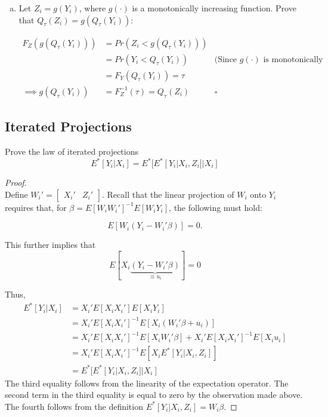 \documentclass[11pt]{article}
\begin{document}
\begin{enumerate}[a)]

	\item Let $Z_i = g(Y_i)$, where $g(\cdot)$ is a monotonically increasing function. Prove that $Q_{\tau}(Z_i) = g(Q_{\tau}(Y_i))$:

	\begin{align*}
		F_Z(g(Q_{\tau}(Y_i))) &= Pr(Z_i < g(Q_{\tau}(Y_i))) \\
		&= Pr(Y_i < Q_{\tau}(Y_i)) &\mbox{(Since $g(\cdot)$ is monotonically increasing)} \\
		&= F_Y(Q_{\tau}(Y_i)) = \tau \\
		\implies g(Q_{\tau}(Y_i)) &= F_Z^{-1}(\tau) = Q_{\tau}(Z_i) &\square
	\end{align*}
	

\end{enumerate}


\subsection*{Iterated Projections}
Prove the law of iterated projections 
$$E^*[Y_i|X_i] = E^*[E^*[Y_i|X_i,Z_i]|X_i]$$

\begin{proof}\mbox{}\\
	Define $W_i' = \begin{bmatrix}X_i' & Z_i'\end{bmatrix}$. Recall that the linear projection of $W_i$ onto $Y_i$ requires that, for $\beta = E[W_i W_i']^{-1}E[W_i Y_i]$, the following must hold:

	$$E[W_i(Y_i - W_i'\beta)] = 0.$$

	This further implies that $$E[X_i\underbrace{(Y_i - W_i'\beta)}_{\equiv u_i}] = 0$$

	Thus,
	\begin{align*}
		E^*[Y_i|X_i] & = X_i'E[X_iX_i']E[X_iY_i] \\
		& = X_i'E[X_iX_i']^{-1}E[X_i(W_i'\beta + u_i)] \\
		& = X_i'E[X_iX_i']^{-1}E[X_i W_i'\beta] + X_i'E[X_iX_i']^{-1}E[X_i u_i] \\
		& = X_i'E[X_iX_i']^{-1}E[X_i E^*[Y_i|X_i,Z_i]] \\
		& = E^*[E^*[Y_i|X_i,Z_i]|X_i]
	\end{align*}
	The third equality follows from the linearity of the expectation operator. The second term in the third equality is equal to zero by the observation made above. The fourth follows from the definition $E^*[Y_i|X_i,Z_i] = W_i\beta$.
	\end{proof}
\end{document}
